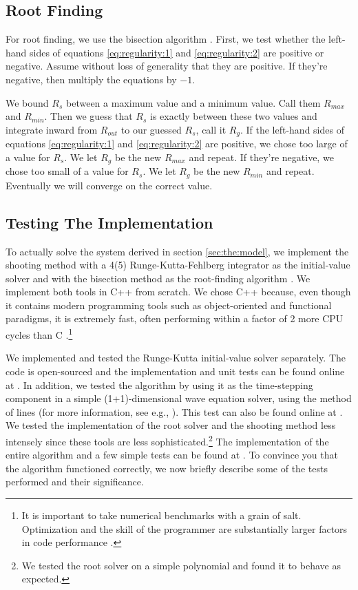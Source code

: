 \documentclass[]{article}
\begin{document}
\subsection{Root Finding}
\label{subsec:root:finding}

For root finding, we use the bisection algorithm
\cite{Heath}. First, we test whether the left-hand sides of equations
\eqref{eq:regularity:1} and \eqref{eq:regularity:2} are positive or
negative. Assume without loss of generality that they are positive. If
they're negative, then multiply the equations by $-1$.

We bound $R_s$ between a maximum value and a minimum value. Call them
$R_{max}$ and $R_{min}.$ Then we guess that $R_s$ is exactly between
these two values and integrate inward from $R_{out}$ to our guessed
$R_s$, call it $R_g$. If the left-hand sides of equations
\eqref{eq:regularity:1} and \eqref{eq:regularity:2} are positive, we
chose too large of a value for $R_s$. We let $R_g$ be the new
$R_{max}$ and repeat. If they're negative, we chose too small of a value
for $R_s$. We let $R_g$ be the new $R_{min}$ and repeat. Eventually we
will converge on the correct value.

\subsection{Testing The Implementation}
\label{subsec:implementation:testing}

To actually solve the system derived in section \ref{sec:the:model},
we implement the shooting method with a 4(5) Runge-Kutta-Fehlberg
integrator as the initial-value solver and with the bisection method
as the root-finding algorithm \cite{NumericalRecipes,Heath}. We
implement both tools in C++ from scratch. We chose C++ because, even
though it contains modern programming tools such as object-oriented
and functional paradigms, it is extremely fast, often performing
within a factor of 2 more CPU cycles than C
\cite{BenchmarksGame}.\footnote{It is important to take numerical
  benchmarks with a grain of salt. Optimization and the skill of the
  programmer are substantially larger factors in code performance
  \cite{WrongData}.} 

We implemented and tested the Runge-Kutta initial-value solver
separately. The code is open-sourced and the implementation and unit
tests can be found online at \cite{RKF45}. In addition, we tested the
algorithm by using it as the time-stepping component in a simple
(1+1)-dimensional wave equation solver, using the method of lines (for
more information, see e.g., \cite{Heath}). This test can also be found
online at \cite{WaveEquation}. We tested the implementation of the
root solver and the shooting method less intensely since these tools
are less sophisticated.\footnote{We tested the root solver on a simple
  polynomial and found it to behave as expected.} The implementation
of the entire algorithm and a few simple tests can be found at
\cite{AccretionShooting}. To convince you that the algorithm
functioned correctly, we now briefly describe some of the tests
performed and their significance.
\end{document}
